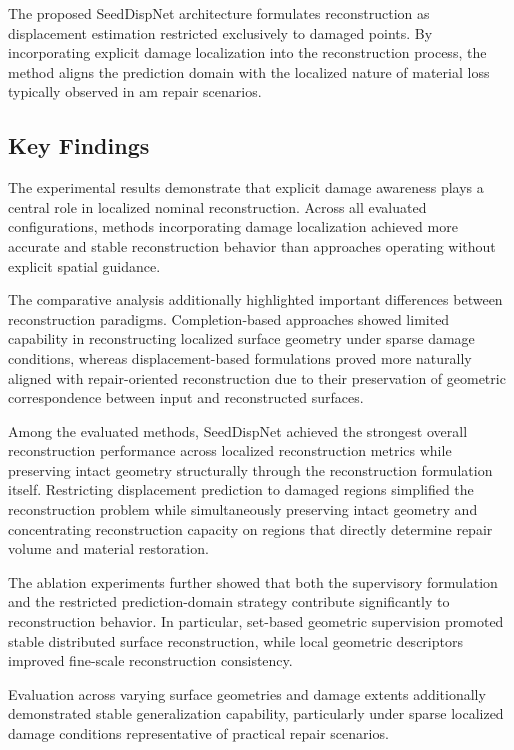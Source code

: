 The proposed SeedDispNet architecture formulates reconstruction as displacement estimation restricted exclusively to damaged points. By incorporating explicit damage localization into the reconstruction process, the method aligns the prediction domain with the localized nature of material loss typically observed in \ac{am} repair scenarios.

\subsection{Key Findings}

The experimental results demonstrate that explicit damage awareness plays a central role in localized nominal reconstruction. Across all evaluated configurations, methods incorporating damage localization achieved more accurate and stable reconstruction behavior than approaches operating without explicit spatial guidance.

The comparative analysis additionally highlighted important differences between reconstruction paradigms. Completion-based approaches showed limited capability in reconstructing localized surface geometry under sparse damage conditions, whereas displacement-based formulations proved more naturally aligned with repair-oriented reconstruction due to their preservation of geometric correspondence between input and reconstructed surfaces.

Among the evaluated methods, SeedDispNet achieved the strongest overall reconstruction performance across localized reconstruction metrics while preserving intact geometry structurally through the reconstruction formulation itself. Restricting displacement prediction to damaged regions simplified the reconstruction problem while simultaneously preserving intact geometry and concentrating reconstruction capacity on regions that directly determine repair volume and material restoration.

The ablation experiments further showed that both the supervisory formulation and the restricted prediction-domain strategy contribute significantly to reconstruction behavior. In particular, set-based geometric supervision promoted stable distributed surface reconstruction, while local geometric descriptors improved fine-scale reconstruction consistency.

Evaluation across varying surface geometries and damage extents additionally demonstrated stable generalization capability, particularly under sparse localized damage conditions representative of practical repair scenarios.

